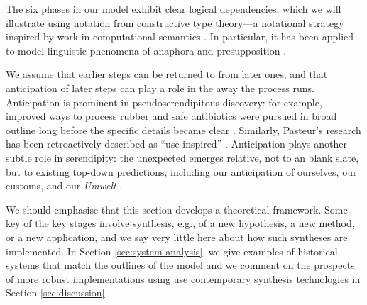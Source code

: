 
The six phases in our model exhibit clear logical dependencies, which
we will illustrate using notation from constructive type theory---a
notational strategy inspired by work in computational semantics
\cite{Chatzikyriakidis2018}.  In particular, it has been applied to
model linguistic phenomena of anaphora and presupposition
\cite{10.1007/978-3-662-43742-1_2,krahmer1999presupposition,piwek2000presuppositions}.

We assume that earlier steps can be returned to from later ones, and
that anticipation of later steps can play a role in the away the
process runs.  Anticipation is prominent in pseudoserendipitous
discovery: for example, improved ways to process rubber and safe
antibiotics were pursued in broad outline long before the specific
details became clear \cite{fleming,goodyear1855gum}.  Similarly,
Pasteur's research has been retroactively described as
``use-inspired'' \cite{stokes1997pasteur}.  Anticipation plays another
subtle role in serendipity: the unexpected emerges relative, not to an
blank slate, but to existing top-down predictions, including our
anticipation of ourselves, our customs, and our \emph{Umwelt}
\cite{dennett_2013}.

We should emphasise that this section develops a theoretical
framework.  Some key of the key stages
involve synthesis, e.g., of a new hypothesis, a new method, or a new
application, and we say very little here about how such syntheses are
implemented.  In Section \ref{sec:system-analysis}, we give examples
of historical systems that match the outlines of the model and we
comment on the prospects of more robust implementations using use
contemporary synthesis technologies in Section \ref{sec:discussion}.



